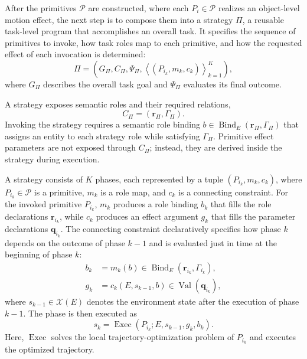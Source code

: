 After the primitives $\mathcal{P}$ are constructed, where each $P_i \in \mathcal{P}$ realizes an object-level motion effect, the next step is to compose them into a strategy $\Pi$, a reusable task-level program that accomplishes an overall task. It specifies the sequence of primitives to invoke, how task roles map to each primitive, and how the requested effect of each invocation is determined:
\begin{equation*}
    \Pi
    = \left(G_\Pi,C_\Pi,\Psi_\Pi,
      \left\langle(P_{i_k},m_k,c_k)\right\rangle_{k=1}^{K}\right),
\end{equation*}
where $G_\Pi$ describes the overall task goal and $\Psi_\Pi$ evaluates its final outcome.

A strategy exposes semantic roles and their required relations,
\begin{equation*}
    C_\Pi=(\mathbf{r}_\Pi,\Gamma_\Pi).
\end{equation*}
Invoking the strategy requires a semantic role binding $b\in\operatorname{Bind}_E(\mathbf{r}_\Pi,\Gamma_\Pi)$ that assigns an entity to each strategy role while satisfying $\Gamma_\Pi$. Primitive effect parameters are not exposed through $C_\Pi$; instead, they are derived inside the strategy during execution.

A strategy consists of $K$ phases, each represented by a tuple $(P_{i_k},m_k,c_k)$, where $P_{i_k} \in \mathcal{P}$ is a primitive, $m_k$ is a role map, and $c_k$ is a connecting constraint. For the invoked primitive $P_{i_k}$, $m_k$ produces a role binding $b_k$ that fills the role declarations $\mathbf{r}_{i_k}$, while $c_k$ produces an effect argument $g_k$ that fills the parameter declarations $\mathbf{q}_{i_k}$. The connecting constraint declaratively specifies how phase $k$ depends on the outcome of phase $k-1$ and is evaluated just in time at the beginning of phase $k$:
\begin{equation*}
    \begin{aligned}
        b_k&=m_k(b)
            \in\operatorname{Bind}_E(\mathbf{r}_{i_k},\Gamma_{i_k}),\\
        g_k&=c_k(E,s_{k-1},b)
            \in\operatorname{Val}(\mathbf{q}_{i_k}),
    \end{aligned}
\end{equation*}
where $s_{k-1}\in\mathcal{X}(E)$ denotes the environment state after the execution of phase $k-1$. The phase is then executed as
\begin{equation*}
    s_k=\operatorname{Exec}\!\left(
        P_{i_k};E,s_{k-1},g_k,b_k\right).
\end{equation*}
Here, $\operatorname{Exec}$ solves the local trajectory-optimization problem of $P_{i_k}$ and executes the optimized trajectory.

